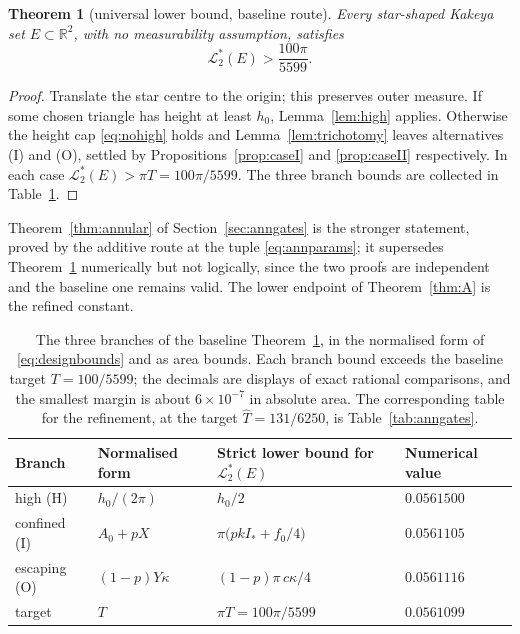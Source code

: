 \documentclass[11pt]{article}
\theoremstyle{plain}
\newtheorem{theorem}{Theorem}[section]
\theoremstyle{definition}
\theoremstyle{remark}
\newcommand{\R}{\mathbb{R}}
\newcommand{\Lout}{\mathcal{L}^{*}_{2}}
\newcommand{\Istar}{I_{*}}
\begin{document}
\begin{theorem}[universal lower bound, baseline route]\label{thm:lower}
Every star-shaped Kakeya set $E\subset\R^{2}$, with no measurability assumption,
satisfies
\[
  \Lout(E)>\frac{100\pi}{5599}.
\]
\end{theorem}

\begin{proof}
Translate the star centre to the origin; this preserves outer measure. If some
chosen triangle has height at least $h_{0}$, Lemma~\ref{lem:high} applies. Otherwise
the height cap \eqref{eq:nohigh} holds and Lemma~\ref{lem:trichotomy} leaves
alternatives (I) and (O), settled by Propositions~\ref{prop:caseI} and
\ref{prop:caseII} respectively. In each case $\Lout(E)>\pi T=100\pi/5599$. The
three branch bounds are collected in Table~\ref{tab:branches}.
\end{proof}

Theorem~\ref{thm:annular} of Section~\ref{sec:anngates} is the stronger
statement, proved by the additive route at the tuple \eqref{eq:annparams}; it
supersedes Theorem~\ref{thm:lower} numerically but not logically, since the two
proofs are independent and the baseline one remains valid. The lower endpoint
of Theorem~\ref{thm:A} is the refined constant.

\begin{table}[t]
\centering
\small
\begin{tabular}{@{}llll@{}}
\toprule
Branch & Normalised form & Strict lower bound for $\Lout(E)$ & Numerical value \\
\midrule
high (H) & $h_{0}/(2\pi)$ & $h_{0}/2$ & $0.0561500$\\
confined (I) & $A_{0}+pX$ & $\pi\bigl(pk\Istar+f_{0}/4\bigr)$ & $0.0561105$\\
escaping (O) & $(1-p)Y\kappa$ & $(1-p)\pi\,c\kappa/4$ & $0.0561116$\\
\midrule
target & $T$ & $\pi T=100\pi/5599$ & $0.0561099$\\
\bottomrule
\end{tabular}
\caption{The three branches of the baseline Theorem~\ref{thm:lower}, in the
normalised form of \eqref{eq:designbounds} and as area bounds. Each branch bound
exceeds the baseline target $T=100/5599$; the decimals are displays of exact
rational comparisons, and the smallest margin is about $6\times10^{-7}$ in
absolute area. The corresponding table for the refinement, at the target
$\hat T=131/6250$, is Table~\ref{tab:anngates}.}
\label{tab:branches}
\end{table}
\end{document}
